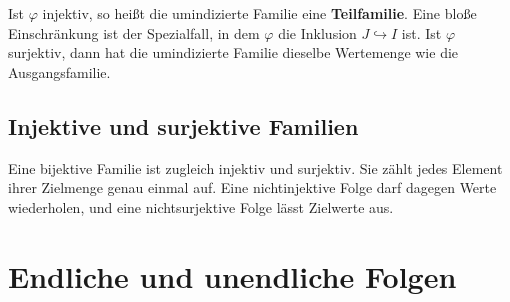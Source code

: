 \documentclass[main.tex]{subfiles}
\begin{document}


Ist \(\varphi\) injektiv, so heißt die umindizierte Familie eine
\textbf{Teilfamilie}. Eine bloße Einschränkung ist der Spezialfall, in dem
\(\varphi\) die Inklusion \(J\hookrightarrow I\) ist. Ist \(\varphi\)
surjektiv, dann hat die umindizierte Familie dieselbe Wertemenge wie die
Ausgangsfamilie.

\section{Injektive und surjektive Familien}




Eine bijektive Familie ist zugleich injektiv und surjektiv. Sie zählt jedes
Element ihrer Zielmenge genau einmal auf. Eine nichtinjektive Folge darf
dagegen Werte wiederholen, und eine nichtsurjektive Folge lässt Zielwerte aus.

\chapter{Endliche und unendliche Folgen}
\end{document}
